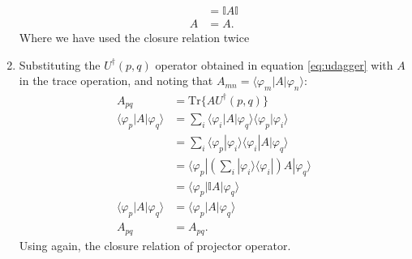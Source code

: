 \documentclass[letterpaper,11pt,twoside]{article}
\begin{document}
\begin{enumerate}[itemsep=0pt,topsep=0pt,label=\alph*.]
\begin{align*}
    &=\mathbb{I}A\mathbb{I}\\
    A&=A.
  \end{align*}
  Where we have used the closure relation twice
  \item Substituting the $U^\dagger(p,q)$ operator obtained in equation \eqref{eq:udagger} with $A$ in the trace operation, and noting that $A_{mn}=\langle\varphi_m|A|\varphi_n\rangle$:
  \begin{align*}
    A_{pq}&=\text{Tr}\{AU^\dagger(p,q)\}\\
    \langle\varphi_p|A|\varphi_q\rangle&=\sum_i \langle\varphi_i|A|\varphi_q\rangle\langle \varphi_p|\varphi_i\rangle\\
    &=\sum_i\langle\varphi_p|\varphi_i\rangle\langle\varphi_i|A|\varphi_q\rangle\\
    &=\langle\varphi_p|\left(\sum_i|\varphi_i\rangle\langle\varphi_i|\right)A|\varphi_q\rangle\\
    &=\langle\varphi_p|\mathbb{I}A|\varphi_q\rangle\\
    \langle\varphi_p|A|\varphi_q\rangle&=\langle\varphi_p|A|\varphi_q\rangle\\
    A_{pq}&=A_{pq}.
  \end{align*}
  Using again, the closure relation of projector operator.
\end{enumerate}




%
\end{document}
